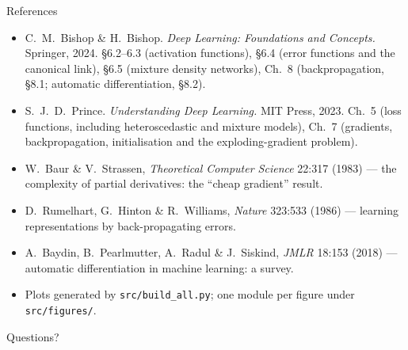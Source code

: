 \documentclass[aspectratio=169, 11pt]{beamer}
\newcommand{\nosrc}{}       %
\begin{document}
\begin{frame}{References}
  \nosrc
  \scriptsize
  \begin{itemize}\setlength{\itemsep}{2pt}
    \item C.~M.~Bishop \& H.~Bishop. \textit{Deep Learning: Foundations
          and Concepts.} Springer, 2024. \S6.2--6.3 (activation
          functions), \S6.4 (error functions and the canonical link),
          \S6.5 (mixture density networks), Ch.~8 (backpropagation,
          \S8.1; automatic differentiation, \S8.2).
    \item S.~J.~D.~Prince. \textit{Understanding Deep Learning.}
          MIT Press, 2023. Ch.~5 (loss functions, including
          heteroscedastic and mixture models), Ch.~7 (gradients,
          backpropagation, initialisation and the exploding-gradient
          problem).
    \item W.~Baur \& V.~Strassen, \textit{Theoretical Computer Science}
          22:317 (1983) --- the complexity of partial derivatives:
          the ``cheap gradient'' result.
    \item D.~Rumelhart, G.~Hinton \& R.~Williams, \textit{Nature}
          323:533 (1986) --- learning representations by
          back-propagating errors.
    \item A.~Baydin, B.~Pearlmutter, A.~Radul \& J.~Siskind,
          \textit{JMLR} 18:153 (2018) --- automatic differentiation in
          machine learning: a survey.
    \item Plots generated by \texttt{src/build\_all.py}; one module per
          figure under \texttt{src/figures/}.
  \end{itemize}
\end{frame}

\begin{frame}[standout]
  \nosrc
  Questions?
\end{frame}
\end{document}
